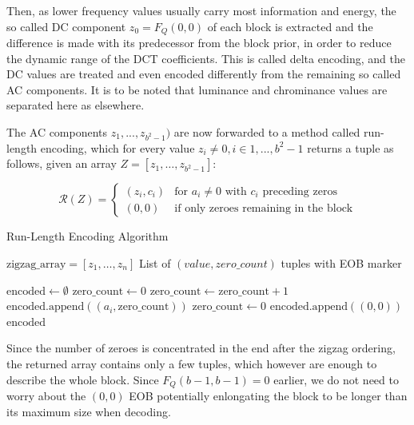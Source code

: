 Then, as lower frequency values usually carry most information and energy, the so called DC component \(z_0 = F_Q(0,0)\) of each block is extracted and the difference is made with its predecessor from the block prior, in order to reduce the dynamic range of the DCT coefficients. This is called delta encoding, and the DC values are treated and even encoded differently from the remaining so called AC components. It is to be noted that luminance and chrominance values are separated here as elsewhere.

The AC components \(z_1,...,z_{b^2-1})\) are now forwarded to a method called run-length encoding, which for every value \(z_i \neq 0, i \in {1,...,b^2-1}\) returns a tuple as follows, given an array \(Z = [z_1, \ldots, z_{b^2-1}]\):

\begin{equation*}
	\mathcal{R}(Z) = \begin{cases}
		(z_i, c_i) & \text{for } a_i \neq 0 \text{ with } c_i \text{ preceding zeros} \\
		(0,0) & \text{if only zeroes remaining in the block}
	\end{cases}
\end{equation*}


\begin{algorithm}
	\caption{Run-Length Encoding Algorithm}
	\label{alg:jpeg-rle}
	\begin{algorithmic}[1]
		\Require $\text{zigzag\_array} = [z_1, \ldots, z_n]$
		\Ensure List of $(value, zero\_count)$ tuples with EOB marker
		
		\State $\text{encoded} \gets \emptyset$
		\State $\text{zero\_count} \gets 0$
		\State $\text{zero\_count} \gets \text{zero\_count} + 1$
		\Else
		\State $\text{encoded.append}((a_i, \text{zero\_count}))$
		\State $\text{zero\_count} \gets 0$ 
		\EndIf
		\EndFor
		\State $\text{encoded.append}((0, 0))$ 
		\State \Return $\text{encoded}$
	\end{algorithmic}
\end{algorithm}

Since the number of zeroes is concentrated in the end after the zigzag ordering, the returned array contains only a few tuples, which however are enough to describe the whole block. Since \(F_Q(b-1,b-1) = 0\) earlier, we do not need to worry about the \((0,0)\) EOB potentially enlongating the block to be longer than its maximum size when decoding.



